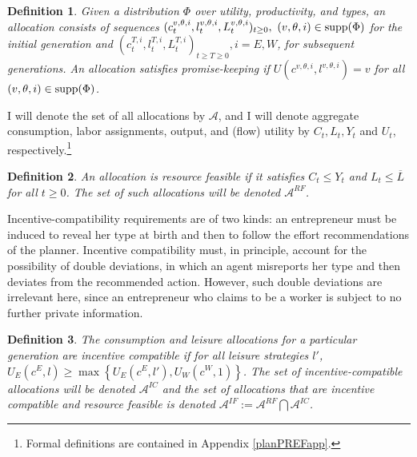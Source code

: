 \documentclass[11pt]{article}
\theoremstyle{plain}
\newtheorem{defn}{Definition}[section]
\begin{document}

\begin{defn} \label{defnALLOC}
Given a distribution $\Phi$ over utility, productivity, and types, an allocation consists of sequences $(c^{v,\theta,i}_t,l^{v,\theta,i}_t,L^{v,\theta,i}_t)_{t\geq 0}, \ (v,\theta,i) \in \textnormal{supp}(\Phi)$ for the initial generation and $(c^{T,i}_t, l^{T,i}_t,L^{T,i}_t)_{t\geq T \geq 0}, i = E,W$, for subsequent generations. An allocation satisfies promise-keeping if $U(c^{v,\theta,i},l^{v,\theta,i})= v$ for all $(v,\theta,i) \in \textnormal{supp}(\Phi)$.

\end{defn}
I will denote the set of all allocations by $\mathcal{A}$, and I will denote aggregate consumption, labor assignments, output, and (flow) utility by $C_t, L_t, Y_t$ and $U_t$, respectively.\footnote{Formal definitions are contained in Appendix \ref{planPREFapp}.} 

\begin{defn}
An allocation is resource feasible if it satisfies $C_t \leq Y_t$ and $L_t \leq \overline{L}$ for all $t\geq0$. The set of such allocations will be denoted $\mathcal{A}^{RF}$.
\end{defn}

Incentive-compatibility requirements are of two kinds: an entrepreneur must be induced to reveal her type at birth and then to follow the effort recommendations of the planner. Incentive compatibility must, in principle, account for the possibility of double deviations, in which an agent misreports her type and then deviates from the recommended action. However, such double deviations are irrelevant here, since an entrepreneur who claims to be a worker is subject to no further private information. 

\begin{defn}
The consumption and leisure allocations for a particular generation are incentive compatible if for all leisure strategies $l'$, $U_E(c^E,l) \geq \max\left\{ U_E(c^E,l'), U_W(c^W,1)\right\}$. The set of incentive-compatible allocations will be denoted $\mathcal{A}^{IC}$ and the set of allocations that are incentive compatible and resource feasible is denoted $\mathcal{A}^{IF} := \mathcal{A}^{RF} \bigcap \mathcal{A}^{IC}$.
\end{defn}
\end{document}
